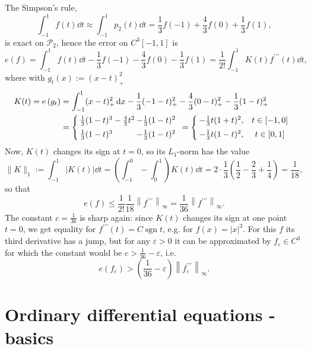\documentclass[a4paper]{article}
\renewcommand{\epsilon}{\varepsilon}
\begin{document}
\begin{example}
    The Simpson's rule,
\[
\int_{-1}^1 f(t) \dd{t} \approx \int_{-1}^1 p_2(t) \dd{t}=\frac{1}{3} f(-1)+\frac{4}{3} f(0)+\frac{1}{3} f(1),
\]
is exact on $\mathcal{P}_2$, hence the error on $C^3[-1,1]$ is
\[
e(f)=\int_{-1}^1 f(t) \dd{t}-\frac{1}{3} f(-1)-\frac{4}{3} f(0)-\frac{1}{3} f(1)=\frac{1}{2 !} \int_{-1}^1 K(t) f^{\prime \prime \prime}(t) \dd{t},
\]
where with $g_t(x):=(x-t)_{+}^2$
\[
\begin{aligned}
K(t)=e\left(g_t\right) & =\int_{-1}^1(x-t)_{+}^2 \dd{x}-\frac{1}{3}(-1-t)_{+}^2-\frac{4}{3}(0-t)_{+}^2-\frac{1}{3}(1-t)_{+}^2 \\
& =\left\{\hspace*{-.3em}\begin{array}{ll}
\frac{1}{3}(1-t)^3-\frac{4}{3} t^2&\hspace*{-.8em}-\frac{1}{3}(1-t)^2 \\[.5em]
\frac{1}{3}(1-t)^3 &\hspace*{-.8em} -\frac{1}{3}(1-t)^2
\end{array}=\left\{\hspace*{-.3em}\begin{array}{cc}
-\frac{1}{3} t(1+t)^2, & t \in[-1,0] \\[.5em]
-\frac{1}{3} t(1-t)^2, & t \in[0,1]
\end{array}\right.\right.
\end{aligned}
\]
Now, $K(t)$ changes its sign at $t=0$, so its $L_1$-norm has the value
\[
\|K\|_1:=\int_{-1}^1|K(t)| \dd{t}=\left(\int_{-1}^0-\int_0^1\right) K(t) \dd{t}=2 \cdot \frac{1}{3}\left(\frac{1}{2}-\frac{2}{3}+\frac{1}{4}\right)=\frac{1}{18},
\]
so that
\[
e(f) \leq \frac{1}{2 !} \frac{1}{18}\left\|f^{\prime \prime \prime}\right\|_{\infty}=\frac{1}{36}\left\|f^{\prime \prime \prime}\right\|_{\infty} .
\]
The constant $c=\frac{1}{36}$ is sharp again: since $K(t)$ changes its sign at one point $t=0$, we get equality for $f^{\prime \prime \prime}(t)=C \operatorname{sgn} t$, e.g. for $f(x)=|x|^3$. For this $f$ its third derivative has a jump, but for any $\epsilon>0$ it can be approximated by $f_\epsilon \in C^3$ for which the constant would be $c>\frac{1}{36}-\epsilon$, i.e.
\[
e\left(f_\epsilon\right)>\left(\frac{1}{36}-\epsilon\right)\left\|f_\epsilon^{\prime \prime \prime}\right\|_{\infty} .
\]
\end{example}

\section{Ordinary differential equations - basics}
\end{document}
